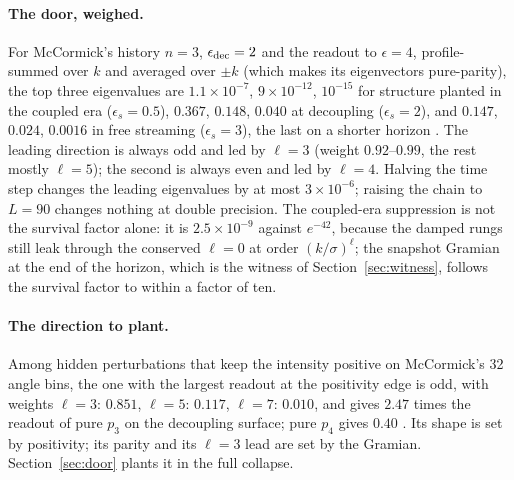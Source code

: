 \paragraph{The door, weighed.} For McCormick's history $n=3$, $\epsilon_{\rm dec}=2$ and the readout to $\epsilon=4$, profile-summed over $k$ and averaged over $\pm k$ (which makes its eigenvectors pure-parity), the top three eigenvalues are $1.1\times10^{-7}$, $9\times10^{-12}$, $10^{-15}$ for structure planted in the coupled era ($\epsilon_s=0.5$), $0.367$, $0.148$, $0.040$ at decoupling ($\epsilon_s=2$), and $0.147$, $0.024$, $0.0016$ in free streaming ($\epsilon_s=3$), the last on a shorter horizon . The leading direction is always odd and led by $\ell=3$ (weight $0.92$--$0.99$, the rest mostly $\ell=5$); the second is always even and led by $\ell=4$. Halving the time step changes the leading eigenvalues by at most $3\times10^{-6}$; raising the chain to $L=90$ changes nothing at double precision. The coupled-era suppression is not the survival factor alone: it is $2.5\times10^{-9}$ against $e^{-42}$, because the damped rungs still leak through the conserved $\ell=0$ at order $(k/\sigma)^\ell$; the snapshot Gramian at the end of the horizon, which is the witness of Section~\ref{sec:witness}, follows the survival factor to within a factor of ten.

\paragraph{The direction to plant.} Among hidden perturbations that keep the intensity positive on McCormick's 32 angle bins, the one with the largest readout at the positivity edge is odd, with weights $\ell=3$: $0.851$, $\ell=5$: $0.117$, $\ell=7$: $0.010$, and gives $2.47$ times the readout of pure $p_3$ on the decoupling surface; pure $p_4$ gives $0.40$ . Its shape is set by positivity; its parity and its $\ell=3$ lead are set by the Gramian. Section~\ref{sec:door} plants it in the full collapse.

